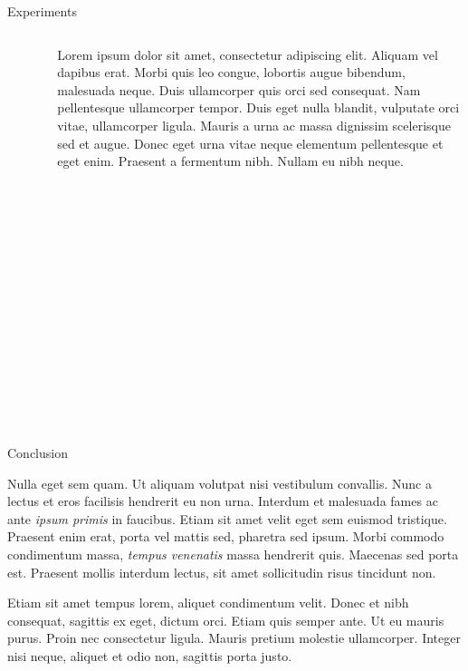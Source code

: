 \documentclass[final]{beamer}
\newlength{\colwidth}
\begin{document}
\begin{frame}[t]
\begin{columns}[t]
\begin{column}{\colwidth}
\begin{block}{Experiments}
\vspace{1em}

\begin{columns}
\begin{column}{0.4\textwidth}
\begin{center}
      \begin{figure}
      \caption{Another figure caption.}
    \end{figure}
   \end{center}
\end{column}
\begin{column}{0.6\textwidth}  %
\justify
Lorem ipsum dolor sit amet, consectetur adipiscing elit. Aliquam vel dapibus erat. Morbi quis leo congue, lobortis augue bibendum, malesuada neque. Duis ullamcorper quis orci sed consequat. Nam pellentesque ullamcorper tempor. Duis eget nulla blandit, vulputate orci vitae, ullamcorper ligula. Mauris a urna ac massa dignissim scelerisque sed et augue. Donec eget urna vitae neque elementum pellentesque et eget enim. Praesent a fermentum nibh. Nullam eu nibh neque. 
\end{column}
\end{columns}


  \end{block}

  \begin{block}{Conclusion}

    Nulla eget sem quam. Ut aliquam volutpat nisi vestibulum convallis. Nunc a
    lectus et eros facilisis hendrerit eu non urna. Interdum et malesuada fames
    ac ante \textit{ipsum primis} in faucibus. Etiam sit amet velit eget sem
    euismod tristique. Praesent enim erat, porta vel mattis sed, pharetra sed
    ipsum. Morbi commodo condimentum massa, \textit{tempus venenatis} massa
    hendrerit quis. Maecenas sed porta est. Praesent mollis interdum lectus,
    sit amet sollicitudin risus tincidunt non.

    Etiam sit amet tempus lorem, aliquet condimentum velit. Donec et nibh
    consequat, sagittis ex eget, dictum orci. Etiam quis semper ante. Ut eu
    mauris purus. Proin nec consectetur ligula. Mauris pretium molestie
    ullamcorper. Integer nisi neque, aliquet et odio non, sagittis porta justo.


\end{block}
\end{column}
\end{columns}
\end{frame}
\end{document}
